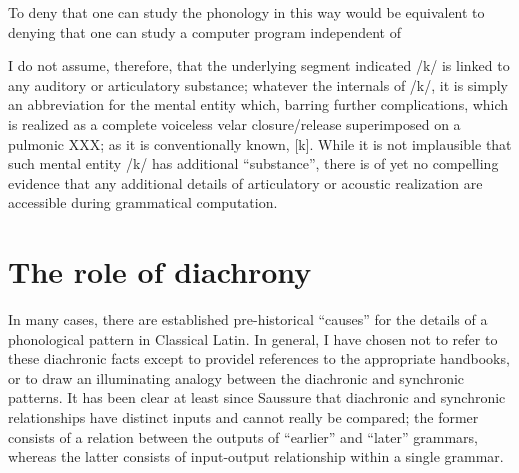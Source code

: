 To deny that one can study the phonology in this way would be equivalent to denying that one can study a computer program independent of

I do not assume, therefore, that the underlying segment indicated /k/ is linked to any auditory or articulatory substance; whatever the internals of /k/, it is simply an abbreviation for the mental entity which, barring further complications, which is realized as a complete voiceless velar closure/release superimposed on a pulmonic XXX; as it is conventionally known, [k].
While it is not implausible that such mental entity /k/ has additional ``substance'', there is of yet no compelling evidence that any additional details of articulatory or acoustic realization are accessible during grammatical computation.


\section{The role of diachrony}

In many cases, there are established pre-historical ``causes'' for the details of a phonological pattern in Classical Latin.
In general, I have chosen not to refer to these diachronic facts except to providel references to the appropriate handbooks, or to draw an illuminating analogy between the diachronic and synchronic patterns.
It has been clear at least since Saussure that diachronic and synchronic relationships have distinct inputs and cannot really be compared; the former consists of a relation between the outputs of ``earlier'' and ``later'' grammars, whereas the latter consists of input-output relationship within a single grammar.

